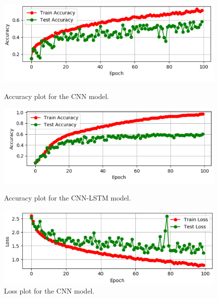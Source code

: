 \documentclass{vldb}
\begin{document}
\begin{figure}[ht] 
  
  \begin{minipage}[b]{0.5\linewidth}
    \centering
    \includegraphics[width=1\linewidth]{photo/cnnaccuracy.PNG} 
    \caption{Accuracy plot for the CNN model.}
    \label{fig:b}
    \vspace{4ex}
  \end{minipage}%
  \label{fig:7869}
  \begin{minipage}[b]{0.5\linewidth}
    \centering
    \includegraphics[width=1\linewidth]{photo/cnnlstmaccuracy.PNG} 
    \caption{Accuracy plot for the CNN-LSTM model.} 
    \vspace{4ex}
  \end{minipage} 
  \begin{minipage}[b]{0.5\linewidth}
    \centering
    \includegraphics[width=1\linewidth]{photo/cnnloss.PNG} 
    \caption{Loss plot for the CNN model.} 
    \vspace{4ex}
  \end{minipage}%
  \begin{minipage}[b]{0.5\linewidth}

\end{minipage}
\end{figure}
\end{document}

